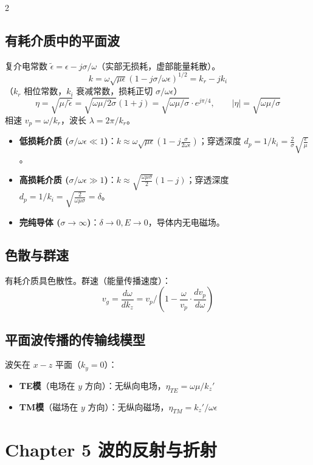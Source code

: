 \documentclass[10pt,a4paper,landscape]{article}
\begin{document}
\begin{multicols}{2}
\subsection{有耗介质中的平面波}
复介电常数 $\tilde{\epsilon} = \epsilon - j\sigma/\omega$（实部无损耗，虚部能量耗散）。
\[
k = \omega\sqrt{\mu\epsilon}(1-j\sigma/\omega\epsilon)^{1/2} = k_r - jk_i
\]
（$k_r$ 相位常数，$k_i$ 衰减常数，损耗正切 $\sigma/\omega\epsilon$）
\[
\eta = \sqrt{\mu/\tilde{\epsilon}} = \sqrt{\omega\mu/2\sigma}(1+j) = \sqrt{\omega\mu/\sigma}\cdot e^{j\pi/4}, \qquad |\eta| = \sqrt{\omega\mu/\sigma}
\]
相速 $v_p = \omega/k_r$，波长 $\lambda = 2\pi/k_r$。
\begin{itemize}
    \item \textbf{低损耗介质 ($\sigma/\omega\epsilon \ll 1$)}：$k \approx \omega\sqrt{\mu\epsilon}(1 - j\frac{\sigma}{2\omega\epsilon})$；穿透深度 $d_p = 1/k_i = \frac{2}{\sigma}\sqrt{\frac{\epsilon}{\mu}}$。
    \item \textbf{高损耗介质 ($\sigma/\omega\epsilon \gg 1$)}：$k \approx \sqrt{\frac{\omega\mu\sigma}{2}}(1-j)$；穿透深度 $d_p = 1/k_i = \sqrt{\frac{2}{\omega\mu\sigma}} = \delta$。
    \item \textbf{完纯导体 ($\sigma\rightarrow\infty$)}：$\delta\rightarrow 0, E\rightarrow 0$，导体内无电磁场。
\end{itemize}

\subsection{色散与群速}
有耗介质具色散性。群速（能量传播速度）：
\[
v_g = \frac{d\omega}{dk_z} = v_p / \left(1 - \frac{\omega}{v_p}\cdot\frac{dv_p}{d\omega}\right)
\]

\subsection{平面波传播的传输线模型}
波矢在 $x-z$ 平面（$k_y=0$）：
\begin{itemize}
    \item \textbf{TE模}（电场在 $y$ 方向）：无纵向电场，$\eta_{TE} = \omega\mu / k_z'$
    \item \textbf{TM模}（磁场在 $y$ 方向）：无纵向磁场，$\eta_{TM} = k_z' / \omega\epsilon$
\end{itemize}

\section{Chapter 5 波的反射与折射}

\end{multicols}
\end{document}
